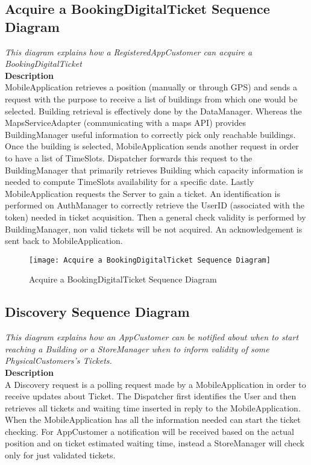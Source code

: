 \newpage
\subsection{Acquire a BookingDigitalTicket Sequence Diagram}
\textit{This diagram explains how a RegisteredAppCustomer can acquire a BookingDigitalTicket\\}
\textbf{Description\\}
MobileApplication retrieves a position (manually or through GPS) and sends a request with the purpose to receive a list of buildings from which one would be selected.
Building retrieval is effectively done by the DataManager. Whereas the MapsServiceAdapter (communicating with a maps API) provides BuildingManager useful information to correctly pick only reachable buildings.
Once the building is selected, MobileApplication sends another request in order to have a list of TimeSlots. Dispatcher forwards this request to the BuildingManager that primarily retrieves Building which capacity information is needed to compute TimeSlots availability for a specific date.
Lastly MobileApplication requests the Server to gain a ticket. An identification is performed on AuthManager to correctly retrieve the UserID (associated with the token) needed in ticket acquisition. Then a general check validity is performed by BuildingManager, non valid tickets will be not acquired. An acknowledgement is sent back to MobileApplication.

\begin{figure}[H]
 \centering
 \texttt{[image: Acquire a BookingDigitalTicket Sequence Diagram]}
 \caption{ Acquire a BookingDigitalTicket Sequence Diagram}
 \end{figure}

\newpage
\subsection{Discovery Sequence Diagram}
\textit{This diagram explains how an AppCustomer can be notified about when to start reaching a Building or a StoreManager when to inform validity of some PhysicalCustomers’s Tickets.\\}
\textbf{Description\\}
A Discovery request is a polling request made by a MobileApplication in order to receive updates about Ticket. The Dispatcher first identifies the User and then retrieves all tickets and waiting time inserted in reply to the MobileApplication.
When the MobileApplication has all the information needed can start the ticket checking.
For AppCustomer a notification will be received based on the actual position and on ticket estimated waiting time, instead a StoreManager will check only for just validated tickets.
\\

